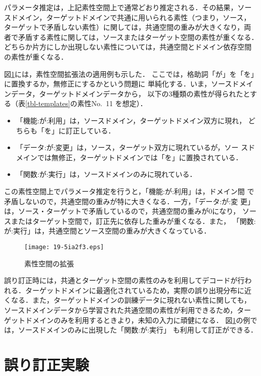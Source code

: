 \documentclass[japanese]{jnlp_1.4}
\begin{document}
パラメータ推定は，上記素性空間上で通常どおり推定される．その結果，ソー
スドメイン，ターゲットドメインで共通に用いられる素性（つまり，ソース，
ターゲットで矛盾しない素性）に関しては，共通空間の重みが大きくなり，両
者で矛盾する素性に関しては，ソースまたはターゲット空間の素性が重くなる．
どちらか片方にしか出現しない素性については，共通空間とドメイン依存空間
の素性が重くなる．

図\ref{fig-augment}には，素性空間拡張法の適用例も示した．
ここでは，格助詞「が」を「を」に置換するか，無修正にするかという問題に
単純化する．いま，ソースドメインデータ，ターゲットドメインデータから，
以下の3種類の素性が得られたとする（表{\ref{tbl-templates}}の素性No.~11
を想定）．

\begin{itemize}
\item 「機能:が:利用」は，ソースドメイン，ターゲットドメイン双方に現れ，
  どちらも「を」に訂正している．
\item 「データ:が:変更」は，ソース，ターゲット双方に現れているが，ソー
  スドメインでは無修正，ターゲットドメインでは「を」に置換されている．
\item 「関数:が:実行」は，ソースドメインのみに現れている．
\end{itemize}

この素性空間上でパラメータ推定を行うと，「機能:が:利用」は，ドメイン間
で矛盾しないので，共通空間の重みが特に大きくなる．一方，「データ:が:変
更」は，ソース・ターゲットで矛盾しているので，共通空間の重みが0になり，
ソースまたはターゲット空間で，訂正先に依存した重みが重くなる．また，
「関数:が:実行」は，共通空間とソース空間の重みが大きくなっている．

\begin{figure}[t]
\begin{center}
\texttt{[image: 19-5ia2f3.eps]}
\end{center}
\caption{素性空間の拡張}
\label{fig-augment}
\end{figure}

誤り訂正時には，共通とターゲット空間の素性のみを利用してデコードが行わ
れる．ターゲットドメインに最適化されているため，実際の誤り出現分布に近
くなる．また，ターゲットドメインの訓練データに現れない素性に関しても，
ソースドメインデータから学習された共通空間の素性が利用できるため，ター
ゲットドメインのみを利用するときより，未知の入力に頑健になる．
図\ref{fig-augment}の例では，ソースドメインのみに出現した「関数:が:実行」
も利用して訂正ができる．



\section{誤り訂正実験}
\label{sec-experiments}
\end{document}
